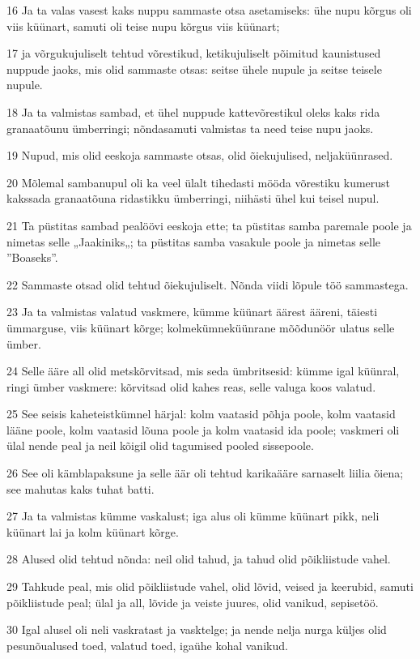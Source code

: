 \par 16 Ja ta valas vasest kaks nuppu sammaste otsa asetamiseks: ühe nupu kõrgus oli viis küünart, samuti oli teise nupu kõrgus viis küünart;
\par 17 ja võrgukujuliselt tehtud võrestikud, ketikujuliselt põimitud kaunistused nuppude jaoks, mis olid sammaste otsas: seitse ühele nupule ja seitse teisele nupule.
\par 18 Ja ta valmistas sambad, et ühel nuppude kattevõrestikul oleks kaks rida granaatõunu ümberringi; nõndasamuti valmistas ta need teise nupu jaoks.
\par 19 Nupud, mis olid eeskoja sammaste otsas, olid õiekujulised, neljaküünrased.
\par 20 Mõlemal sambanupul oli ka veel ülalt tihedasti mööda võrestiku kumerust kakssada granaatõuna ridastikku ümberringi, niihästi ühel kui teisel nupul.
\par 21 Ta püstitas sambad pealöövi eeskoja ette; ta püstitas samba paremale poole ja nimetas selle „Jaakiniks„; ta püstitas samba vasakule poole ja nimetas selle ”Boaseks”.
\par 22 Sammaste otsad olid tehtud õiekujuliselt. Nõnda viidi lõpule töö sammastega.
\par 23 Ja ta valmistas valatud vaskmere, kümme küünart äärest ääreni, täiesti ümmarguse, viis küünart kõrge; kolmekümneküünrane mõõdunöör ulatus selle ümber.
\par 24 Selle ääre all olid metskõrvitsad, mis seda ümbritsesid: kümme igal küünral, ringi ümber vaskmere: kõrvitsad olid kahes reas, selle valuga koos valatud.
\par 25 See seisis kaheteistkümnel härjal: kolm vaatasid põhja poole, kolm vaatasid lääne poole, kolm vaatasid lõuna poole ja kolm vaatasid ida poole; vaskmeri oli ülal nende peal ja neil kõigil olid tagumised pooled sissepoole.
\par 26 See oli kämblapaksune ja selle äär oli tehtud karikaääre sarnaselt liilia õiena; see mahutas kaks tuhat batti.
\par 27 Ja ta valmistas kümme vaskalust; iga alus oli kümme küünart pikk, neli küünart lai ja kolm küünart kõrge.
\par 28 Alused olid tehtud nõnda: neil olid tahud, ja tahud olid põikliistude vahel.
\par 29 Tahkude peal, mis olid põikliistude vahel, olid lõvid, veised ja keerubid, samuti põikliistude peal; ülal ja all, lõvide ja veiste juures, olid vanikud, sepisetöö.
\par 30 Igal alusel oli neli vaskratast ja vasktelge; ja nende nelja nurga küljes olid pesunõualused toed, valatud toed, igaühe kohal vanikud.
